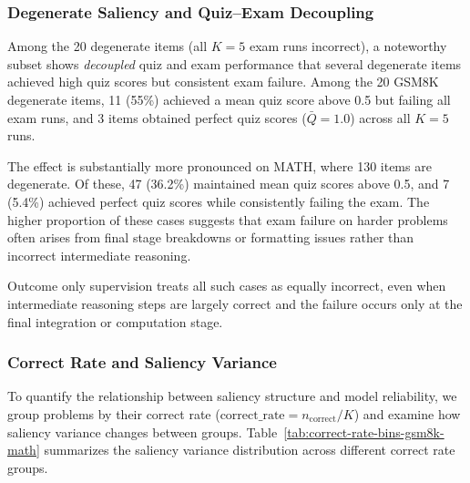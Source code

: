 \documentclass[12pt]{report}
\begin{document}
\subsubsection{Degenerate Saliency and Quiz--Exam Decoupling}
\label{sec:degenerate}

Among the 20 degenerate items (all $K=5$ exam runs incorrect), a
noteworthy subset shows \emph{decoupled} quiz and exam performance
that several degenerate
items achieved high quiz scores but consistent exam failure.
Among the 20 GSM8K degenerate items, 11 (55\%) achieved a mean quiz
score above 0.5 but failing all exam runs, and 3 items obtained
perfect quiz scores ($\bar{Q} = 1.0$) across all $K=5$ runs.

The effect is substantially more pronounced on MATH, where 130 items
are degenerate. Of these, 47 (36.2\%) maintained mean quiz scores
above 0.5, and 7 (5.4\%) achieved perfect quiz scores while
consistently failing the exam. The higher proportion of these
cases suggests that exam failure on harder problems often arises from
final stage breakdowns or formatting issues rather than
incorrect intermediate reasoning.

Outcome only supervision treats all such cases as equally incorrect,
even when intermediate reasoning steps are largely correct and the
failure occurs only at the final integration or computation stage.

\subsubsection{Correct Rate and Saliency Variance}
\label{sec:correct-rate-variance}

To quantify the relationship between saliency structure and model
reliability, we group problems by their correct rate
($\text{correct\_rate} = n_{\text{correct}} / K$) and examine how
saliency variance changes between groups. Table~\ref{tab:correct-rate-bins-gsm8k-math} summarizes the saliency variance distribution across different correct rate groups.
\end{document}
